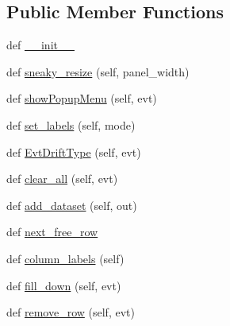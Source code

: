 \subsection*{Public Member Functions}
\begin{DoxyCompactItemize}
\item 
def \hyperlink{class_uni_dec_1_1unidec__modules_1_1tims__import__wizard_1_1import__wizard__grid_1_1_wizard_grid_a41bfc7d0eb8f7c066a1b006b3f7b8a6e}{\+\_\+\+\_\+init\+\_\+\+\_\+}
\item 
def \hyperlink{class_uni_dec_1_1unidec__modules_1_1tims__import__wizard_1_1import__wizard__grid_1_1_wizard_grid_a8cae390b38effbde8dd3637d67ab851a}{sneaky\+\_\+resize} (self, panel\+\_\+width)
\item 
def \hyperlink{class_uni_dec_1_1unidec__modules_1_1tims__import__wizard_1_1import__wizard__grid_1_1_wizard_grid_adafb468bee25b4ea11a8816302e7b76e}{show\+Popup\+Menu} (self, evt)
\item 
def \hyperlink{class_uni_dec_1_1unidec__modules_1_1tims__import__wizard_1_1import__wizard__grid_1_1_wizard_grid_afd959bbed66db4cc63fa13b2e89731ba}{set\+\_\+labels} (self, mode)
\item 
def \hyperlink{class_uni_dec_1_1unidec__modules_1_1tims__import__wizard_1_1import__wizard__grid_1_1_wizard_grid_af80d2a2fdfcb7357161883780e3f21ed}{Evt\+Drift\+Type} (self, evt)
\item 
def \hyperlink{class_uni_dec_1_1unidec__modules_1_1tims__import__wizard_1_1import__wizard__grid_1_1_wizard_grid_a74786d0a3e15d9c0a994c4c912a8e2bb}{clear\+\_\+all} (self, evt)
\item 
def \hyperlink{class_uni_dec_1_1unidec__modules_1_1tims__import__wizard_1_1import__wizard__grid_1_1_wizard_grid_a54d5956b5e981a934407b7f02e2457c2}{add\+\_\+dataset} (self, out)
\item 
def \hyperlink{class_uni_dec_1_1unidec__modules_1_1tims__import__wizard_1_1import__wizard__grid_1_1_wizard_grid_a9fa1b8ff109b2224fb5c354847c64b50}{next\+\_\+free\+\_\+row}
\item 
def \hyperlink{class_uni_dec_1_1unidec__modules_1_1tims__import__wizard_1_1import__wizard__grid_1_1_wizard_grid_ac3059e575c9dff217c9b38ba4d57b954}{column\+\_\+labels} (self)
\item 
def \hyperlink{class_uni_dec_1_1unidec__modules_1_1tims__import__wizard_1_1import__wizard__grid_1_1_wizard_grid_a01e731359ba23e7407ff18121b7cb21f}{fill\+\_\+down} (self, evt)
\item 
def \hyperlink{class_uni_dec_1_1unidec__modules_1_1tims__import__wizard_1_1import__wizard__grid_1_1_wizard_grid_a933a425b1dad54c865d2300b6b18d1d5}{remove\+\_\+row} (self, evt)
\end{DoxyCompactItemize}
